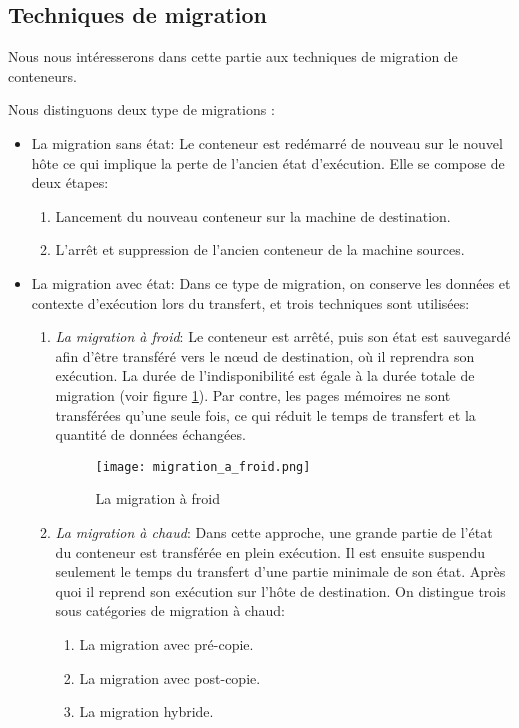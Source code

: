 \subsection{Techniques de migration}
Nous nous intéresserons dans cette partie aux techniques de migration de conteneurs.\par
Nous distinguons deux type de migrations \cite{puliafito2019}:
\begin{itemize}
  \item La migration sans état: Le conteneur est redémarré de nouveau sur le nouvel hôte ce qui implique la perte de l'ancien état d'exécution. Elle se compose de deux étapes:
  \begin{enumerate}
    \item Lancement du nouveau conteneur sur la machine de destination.
    \item L'arrêt et suppression de l'ancien conteneur de la machine sources.
  \end{enumerate}
  \item La migration avec état: Dans ce type de migration, on conserve les données et contexte d'exécution lors du transfert, et trois techniques sont utilisées:
    \begin{enumerate}
      \item \emph{La migration à froid}: Le conteneur est arrêté, puis son état est sauvegardé afin d'être transféré vers le nœud de destination, où il reprendra son exécution. La durée de l'indisponibilité est égale à la durée totale de migration (voir figure \ref{fig:migration_a_froid}). Par contre, les pages mémoires ne sont transférées qu'une seule fois, ce qui réduit le temps de transfert et la quantité de données échangées.
      \begin{figure}[H]
      \centering
      \texttt{[image: migration\_a\_froid.png]}
      \caption{La migration à froid}
      \label{fig:migration_a_froid}
      \end{figure}
      \item \emph{La migration à chaud}: Dans cette approche, une grande partie de l'état du conteneur est transférée en plein exécution. Il est ensuite suspendu seulement le temps du transfert d'une partie minimale de son état. Après quoi il reprend son exécution sur l'hôte de destination. On distingue trois sous catégories de migration à chaud:
        \begin{enumerate}
          \item La migration avec pré-copie.
          \item La migration avec post-copie.
          \item La migration hybride.
        \end{enumerate}
      \end{enumerate}
\end{itemize}
